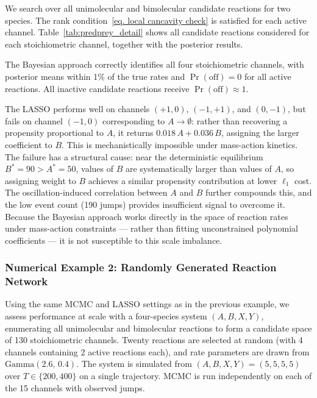 We search over all unimolecular and bimolecular candidate reactions for two species. The rank condition~\eqref{eq. local cancavity check} is satisfied for each active channel. Table~\ref{tab:predprey_detail} shows all candidate reactions considered for each stoichiometric channel, together with the posterior results.



The Bayesian approach correctly identifies all four stoichiometric channels, with posterior means within 1\% of the true rates and $\Pr(\text{off})=0$ for all active reactions. All inactive candidate reactions receive $\Pr(\text{off})\approx 1$.

The LASSO performs well on channels $(+1,0)$, $(-1,+1)$, and $(0,-1)$, but fails on channel $(-1,0)$ corresponding to $A\to\emptyset$: rather than recovering a propensity proportional to $A$, it returns $0.018\,A+0.036\,B$, assigning the larger coefficient to $B$. This is mechanistically impossible under mass-action kinetics. The failure has a structural cause: near the deterministic equilibrium $B^*=90>A^*=50$, values of $B$ are systematically larger than values of $A$, so assigning weight to $B$ achieves a similar propensity contribution at lower $\ell_1$ cost. The oscillation-induced correlation between $A$ and $B$ further compounds this, and the low event count (190 jumps) provides insufficient signal to overcome it. Because the Bayesian approach works directly in the space of reaction rates under mass-action constraints — rather than fitting unconstrained polynomial coefficients — it is not susceptible to this scale imbalance.

\subsubsection*{Numerical Example 2: Randomly Generated Reaction Network}

Using the same MCMC and LASSO settings as in the previous example, we assess performance at scale with a four-species system $(A,B,X,Y)$, enumerating all unimolecular and bimolecular reactions to form a candidate space of 130 stoichiometric channels. Twenty reactions are selected at random (with 4 channels containing 2 active reactions each), and rate parameters are drawn from $\mathrm{Gamma}(2.6,\,0.4)$. The system is simulated from $(A,B,X,Y)=(5,5,5,5)$ over $T\in\{200,400\}$ on a single trajectory. MCMC is run independently on each of the 15 channels with observed jumps.

